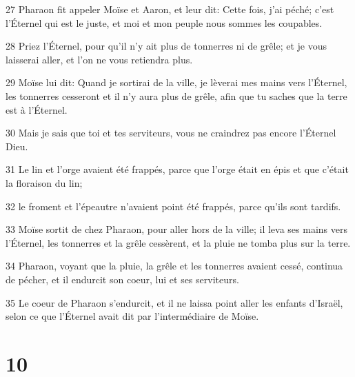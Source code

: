 \par 27 Pharaon fit appeler Moïse et Aaron, et leur dit: Cette fois, j'ai péché; c'est l'Éternel qui est le juste, et moi et mon peuple nous sommes les coupables.
\par 28 Priez l'Éternel, pour qu'il n'y ait plus de tonnerres ni de grêle; et je vous laisserai aller, et l'on ne vous retiendra plus.
\par 29 Moïse lui dit: Quand je sortirai de la ville, je lèverai mes mains vers l'Éternel, les tonnerres cesseront et il n'y aura plus de grêle, afin que tu saches que la terre est à l'Éternel.
\par 30 Mais je sais que toi et tes serviteurs, vous ne craindrez pas encore l'Éternel Dieu.
\par 31 Le lin et l'orge avaient été frappés, parce que l'orge était en épis et que c'était la floraison du lin;
\par 32 le froment et l'épeautre n'avaient point été frappés, parce qu'ils sont tardifs.
\par 33 Moïse sortit de chez Pharaon, pour aller hors de la ville; il leva ses mains vers l'Éternel, les tonnerres et la grêle cessèrent, et la pluie ne tomba plus sur la terre.
\par 34 Pharaon, voyant que la pluie, la grêle et les tonnerres avaient cessé, continua de pécher, et il endurcit son coeur, lui et ses serviteurs.
\par 35 Le coeur de Pharaon s'endurcit, et il ne laissa point aller les enfants d'Israël, selon ce que l'Éternel avait dit par l'intermédiaire de Moïse.

\chapter{10}

